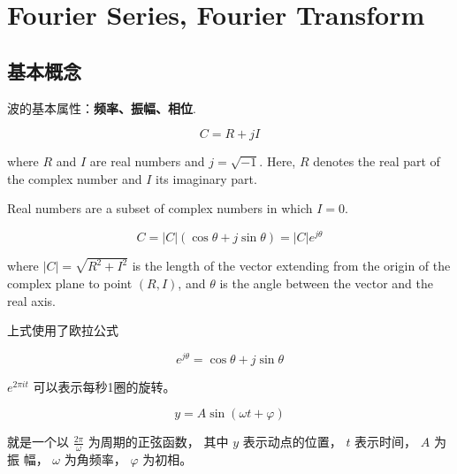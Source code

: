 \chapter{Fourier Series, Fourier  Transform}

\section{基本概念}

\begin{definition}[波]
    波的基本属性：\textbf{频率、振幅、相位}.
\end{definition}

\begin{definition}
    \begin{equation} C=R+j I \end{equation}

    where $ R $ and $ I $ are real numbers and $ j=\sqrt{-1} $. Here, $ R $ denotes the real part of the complex number and $ I $ its imaginary part. 
    
    Real numbers are a subset of complex numbers in which $I = 0$.
\end{definition}

\begin{definition}
    \begin{equation} C=|C|(\cos \theta+j \sin \theta) = |C| e^{j \theta} \end{equation}
    
    where $ |C|=\sqrt{R^{2}+I^{2}} $ is the length of the vector extending from the origin of the complex plane to point $ (R, I) $, and $ \theta $ is the angle between the vector and the real axis.
\end{definition}

上式使用了欧拉公式

\begin{theorem}
    \begin{equation} e^{j \theta}=\cos \theta+j \sin \theta \end{equation}
\end{theorem}

\begin{corollary}
    $e^{2 \pi it}$ 可以表示每秒1圈的旋转。 
\end{corollary}

\begin{definition}[正弦函数]
    \begin{equation} y=A \sin (\omega t+\varphi) \end{equation}

    就是一个以 $ \frac{2 \pi}{\omega} $ 为周期的正弦函数， 其中 $ y $ 表示动点的位置， $ t $ 表示时间， $ A $ 为振 幅， $ \omega $ 为角频率， $ \varphi $ 为初相。
\end{definition}

